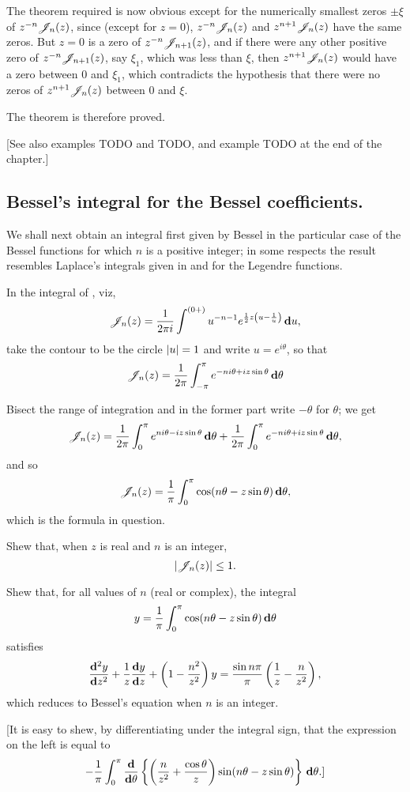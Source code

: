 \documentclass{book}
\begin{document}
The theorem required is now obvious except for the numerically
smallest zeros $\pm \xi$ of $z^{-n}\mathscr{J}_n(z)$, since (except for $z=0$), 
$z^{-n}\mathscr{J}_n(z)$ and $z^{n+1}\mathscr{J}_n(z)$ have the same zeros. But $z=0$ is a
zero of $z^{-n}\mathscr{J}_{n+1}(z)$, and if there were any other positive zero
of $z^{-n}\mathscr{J}_{n+1}(z)$, say $\xi_1$, which was less than $\xi$, then
$z^{n+1}\mathscr{J}_n(z)$ would have a zero between $0$ and $\xi_1$, which
contradicts the hypothesis that there were no zeros of 
$z^{n+1}\mathscr{J}_n(z)$ between $0$ and $\xi$.

The theorem is therefore proved.

[See also  examples TODO and TODO, and example
TODO at the end of the chapter.]
% 
% 
\subsection{Bessel's integral for the Bessel coefficients.}
We shall next obtain an integral first given by Bessel in the
particular case of the Bessel functions for which $n$ is a positive
integer; in some respects the result resembles Laplace's integrals
given in  and 
for the Legendre functions.

In the integral of , viz, 
$$
\mathscr{J}_n(z) 
=
\frac{1}{2\pi i}
\int^{(0+)}
u^{-n-1}
e^{\frac{1}{2} z \left(  u - \frac{1}{u}  \right)}
\, \mathbf{d} u,
$$
take the contour to be the circle $\left| u \right| = 1$ and write 
$u = e^{i\theta}$, so that
$$
\mathscr{J}_n(z)
= 
\frac{1}{2\pi}
\int_{-\pi}^{\pi}
e^{-ni\theta + iz\sin\theta}
\, \mathbf{d} \theta
$$

Bisect the range of integration and in the former part write 
$-\theta$ for $\theta$; we get
$$
\mathscr{J}_n(z) 
=
\frac{1}{2\pi}
\int_0^{\pi}
e^{n i \theta - i z \sin\theta}
\, \mathbf{d} \theta
+
\frac{1}{2\pi}
\int_0^{\pi}
e^{-n i \theta + i z \sin\theta}
\, \mathbf{d} \theta,
$$
and so
$$
\mathscr{J}_n(z)
=
\frac{1}{\pi}
\int_0^{\pi}
\cos (n \theta - z \sin \theta)
\, \mathbf{d} \theta,
$$
which is the formula in question.
\begin{wandwexample}
  Shew that, when $z$ is real and $n$ is an integer,
  $$
  \left|  \mathscr{J}_n(z)  \right| \leq 1.
  $$
\end{wandwexample}
\begin{wandwexample}
  Shew that, for all values of $n$ (real or complex), the integral
  $$
  y
  =
  \frac{1}{\pi}
  \int_0^{\pi}
  \cos (n \theta - z \sin \theta)
  \, \mathbf{d} \theta
  $$
  satisfies
  $$
  \frac{\mathbf{d}^2 y}{\mathbf{d} z^2}
  +
  \frac{1}{z}
  \frac{\mathbf{d} y}{\mathbf{d} z}
  +
  \left(  1 - \frac{n^2}{z^2}  \right) y
  =
  \frac{ \sin n\pi }{\pi}
  \left(  \frac{1}{z} - \frac{n}{z^2}   \right),
  $$
  which reduces to Bessel's equation when $n$ is an integer.

  [It is easy to shew, by differentiating under the integral sign, that
  the expression on the left is equal to
  $$
  -
  \frac{1}{\pi}
  \int_0^{\pi}
  \frac{\mathbf{d}}{\mathbf{d}\theta}
  \left\{  \left(  \frac{n}{z^2} + \frac{\cos\theta}{z}   \right)
    \sin(n\theta - z \sin\theta) \right\}
  \, \mathbf{d} \theta
  .]
  $$
\end{wandwexample}
% 
\end{document}
